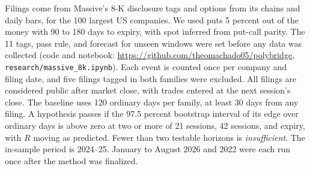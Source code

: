 \documentclass[11pt]{article}
\makeatletter
\renewcommand\section{\@startsection{section}{1}{\z@}{-1.2ex \@plus -.3ex \@minus -.2ex}{0.4ex}{\normalfont\normalsize\bfseries}}
\makeatother
\begin{document}
\section{Data and method}
Filings come from Massive's 8-K disclosure tags and options from its chains and daily bars, for the 100 largest US companies. We used puts 5 percent out of the money with 90 to 180 days to expiry, with spot inferred from put-call parity. The 11 tags, pass rule, and forecast for unseen windows were set before any data was collected (code and notebook: \url{https://github.com/theomachado05/polybridge}, \texttt{research/massive\_8k.ipynb}). Each event is counted once per company and filing date, and five filings tagged in both families were excluded. All filings are considered public after market close, with trades entered at the next session's close. The baseline uses 120 ordinary days per family, at least 30 days from any filing. A hypothesis passes if the 97.5 percent bootstrap interval of its edge over ordinary days is above zero at two or more of 21 sessions, 42 sessions, and expiry, with $R$ moving as predicted. Fewer than two testable horizons is \emph{insufficient}. The in-sample period is 2024--25. January to August 2026 and 2022 were each run once after the method was finalized.
\end{document}
